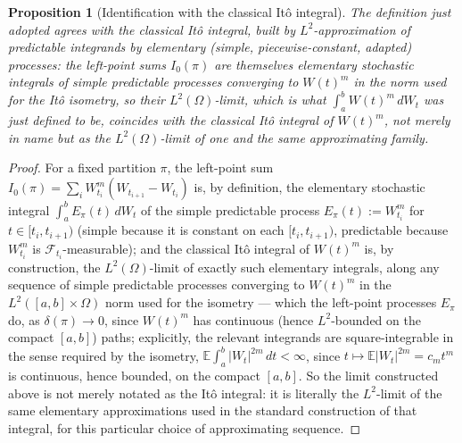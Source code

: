 \documentclass[11pt,fleqn]{article}
\def\E{\mathbb E}
\theoremstyle{plain}
\newtheorem{proposition}[thm]{Proposition}
\theoremstyle{remark}
\begin{document}
\begin{proposition}[Identification with the classical It\^o integral]\label{prop:ito-identification}
The definition just adopted agrees with the classical It\^o integral,
built by $L^2$-approximation of predictable integrands by elementary
(simple, piecewise-constant, adapted) processes: the left-point sums
$I_0(\pi)$ are themselves elementary stochastic integrals of simple
predictable processes converging to $W(t)^m$ in the norm used for the
It\^o isometry, so their $L^2(\Omega)$-limit, which is what
$\int_a^bW(t)^m\,dW_t$ was just defined to be, coincides with the
classical It\^o integral of $W(t)^m$, not merely in name but as the
$L^2(\Omega)$-limit of one and the same approximating family.
\end{proposition}
\begin{proof}
For a fixed
partition $\pi$, the left-point sum
$I_0(\pi)=\sum_iW_{t_i}^m(W_{t_{i+1}}-W_{t_i})$ is, by definition, the
elementary stochastic integral $\int_a^b E_\pi(t)\,dW_t$ of the simple
predictable process $E_\pi(t):=W_{t_i}^m$ for $t\in[t_i,t_{i+1})$ (simple
because it is constant on each $[t_i,t_{i+1})$, predictable because
$W_{t_i}^m$ is $\mathcal F_{t_i}$-measurable); and the classical It\^o
integral of $W(t)^m$ is, by construction, the $L^2(\Omega)$-limit of
exactly such elementary integrals, along any sequence of simple
predictable processes converging to $W(t)^m$ in the $L^2([a,b]\times
\Omega)$ norm used for the isometry --- which the left-point processes
$E_\pi$ do, as $\delta(\pi)\to0$, since $W(t)^m$ has continuous (hence
$L^2$-bounded on the compact $[a,b]$) paths; explicitly, the relevant
integrands are square-integrable in the sense required by the isometry,
$\E\int_a^b|W_t|^{2m}\,dt<\infty$, since $t\mapsto\E|W_t|^{2m}=c_mt^m$
is continuous, hence bounded, on the compact $[a,b]$. So the limit constructed
above is not merely notated as the It\^o integral: it is literally the
$L^2$-limit of the same elementary approximations used in the standard
construction of that integral, for this particular choice of
approximating sequence.
\end{proof}
\end{document}
